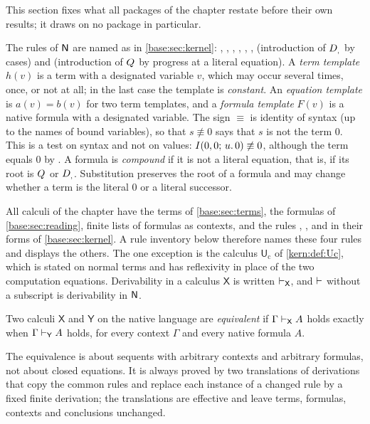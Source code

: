 This section fixes what all packages of the chapter restate before
their own results; it draws on no package in particular.

The rules of $\mathsf{N}$ are named as in \cref{base:sec:kernel}: ,
, , , , ,
 (introduction of $D_{,}$ by cases) and 
(introduction of $Q_{}$ by progress at a literal equation).  A \emph{term
template} $h(v)$ is a term with a designated variable $v$, which may occur
several times, once, or not at all; in the last case the template is
\emph{constant}.  An \emph{equation template} is $a(v)=b(v)$ for two term
templates, and a \emph{formula template} $F(v)$ is a native formula with a
designated variable.  The sign $\equiv$ is identity of syntax (up to the
names of bound variables), so that $s\not\equiv 0$ says that $s$ is not the
term $0$.  This is a test on syntax and not on values:
$I(0,0;\,u.\,0)\not\equiv 0$, although the term equals $0$ by .
A formula is \emph{compound} if it is not a literal equation, that is, if its
root is $Q_{}$ or $D_{,}$.  Substitution preserves the root of a formula and
may change whether a term is the literal $0$ or a literal successor.

All calculi of the chapter have the terms of \cref{base:sec:terms}, the
formulas of \cref{base:sec:reading}, finite lists of formulas as contexts, and
the rules , ,  and  in
their forms of \cref{base:sec:kernel}.  A rule inventory below therefore
names these four rules and displays the others.  The one exception is the
calculus $\mathsf{U}_{\mathrm{c}}$ of \cref{kern:def:Uc}, which is stated on
normal terms and has reflexivity in place of the two computation equations.
Derivability in a calculus
$\mathsf{X}$ is written $\vdash_{\mathsf{X}}$, and $\vdash$ without a
subscript is derivability in $\mathsf{N}$.

\begin{definition}
\label{kern:def:equiv}
Two calculi $\mathsf{X}$ and $\mathsf{Y}$ on the native language are
\emph{equivalent} if $\Gamma\vdash_{\mathsf{X}}A$ holds exactly when
$\Gamma\vdash_{\mathsf{Y}}A$ holds, for every context $\Gamma$ and every
native formula $A$.
\end{definition}

The equivalence is about sequents with arbitrary contexts and arbitrary
formulas, not about closed equations.  It is always proved by two translations
of derivations that copy the common rules and replace each instance of a
changed rule by a fixed finite derivation; the translations are effective and
leave terms, formulas, contexts and conclusions unchanged.

